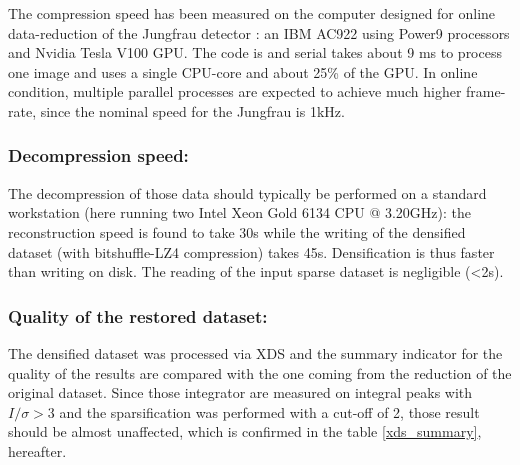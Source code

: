\documentclass[preprint]{iucr}              %
\begin{document}

The compression speed has been measured on the computer designed for online data-reduction of the Jungfrau detector \cite{sri2021}: 
an IBM AC922 using Power9 processors and Nvidia Tesla V100 GPU. 
The code is and serial takes about 9 ms to process one image and uses a single CPU-core and about 25\% of the GPU. 
In online condition, multiple parallel processes are expected to achieve much higher frame-rate, since the nominal speed for the Jungfrau is 1kHz.

\subsubsection{Decompression speed:} 
The decompression of those data should typically be performed on a standard workstation (here running two Intel Xeon Gold 6134 CPU @ 3.20GHz): the reconstruction speed is found to take 30s while the writing of the densified dataset (with bitshuffle-LZ4 compression) takes 45s. 
Densification is thus faster than writing on disk.
The reading of the input sparse dataset is negligible (<2s).

\subsubsection{Quality of the restored dataset:} 
The densified dataset was processed via XDS and the summary indicator for the quality of the results are compared with the one coming from the reduction of the original dataset. 
Since those integrator are measured on integral peaks with $I/\sigma>3$ and the sparsification was performed
with a cut-off of 2, those result should be almost unaffected, which is confirmed in the table \ref{xds_summary}, hereafter.
\end{document}
